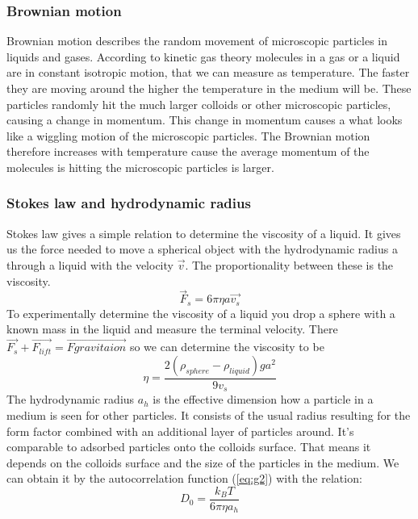 \documentclass[]{article}
\begin{document}
\subsubsection{Brownian motion}
Brownian motion describes the random movement of microscopic particles in liquids and gases. According to kinetic gas theory molecules in a gas or a liquid are in constant isotropic motion, that we can measure as temperature. The faster they are moving around the higher the temperature in the medium will be. These particles randomly hit the much larger colloids or other microscopic particles, causing a change in momentum. This change in momentum causes a what looks like a wiggling motion of the microscopic particles. The Brownian motion therefore increases with temperature cause the average momentum of the molecules is hitting the microscopic particles is larger.


\subsubsection{Stokes law and hydrodynamic radius}
Stokes law gives a simple relation to determine the viscosity of a liquid. It gives us the force needed to move a spherical object with the hydrodynamic radius a through a liquid with the velocity $\vec{v}$. The proportionality between these is the viscosity.
\begin{equation}\label{eq:Stokes}
	\vec{F}_s=6 \pi \eta a \vec{v_s}
\end{equation}
To experimentally determine the viscosity of a liquid you drop a sphere with a known mass in the liquid and measure the terminal velocity. There $\vec{F_s}+\vec{F_{lift}}=\vec{F{gravitaion}}$ so we can determine the viscosity to be
\begin{equation}
	\eta=\frac{2(\rho_{sphere}-\rho_{liquid})g  a^2}{9v_s}
\end{equation} 
The hydrodynamic radius $a_h$ is the effective dimension how a particle in a medium is seen for other particles. It consists of the usual radius resulting for the form factor combined with an additional layer of particles around. It's comparable to adsorbed particles onto the colloids surface. That means it depends on the colloids surface and the size of the particles in the medium. We can obtain it by the autocorrelation function (\ref{eq:g2}) with the relation: 
\begin{equation}\label{eq:D0}
D_0 = \frac{k_BT}{6\pi\eta a_h}
\end{equation}
\end{document}

